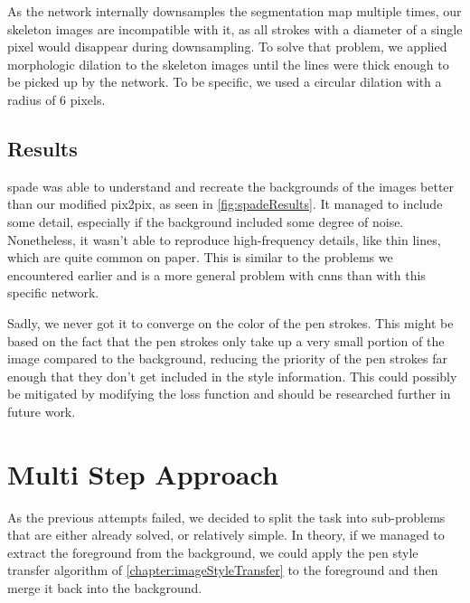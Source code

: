 As the network internally downsamples the segmentation map multiple times, our skeleton images are incompatible with it, as all strokes with a diameter of a single pixel would disappear during downsampling. To solve that problem, we applied morphologic dilation to the skeleton images until the lines were thick enough to be picked up by the network. To be specific, we used a circular dilation with a radius of 6 pixels.

\subsection{Results}



\gls{spade} was able to understand and recreate the backgrounds of the images better than our modified \gls{pix2pix}, as seen in \cref{fig:spadeResults}. It managed to include some detail, especially if the background included some degree of noise. Nonetheless, it wasn't able to reproduce high-frequency details, like thin lines, which are quite common on paper. This is similar to the problems we encountered earlier and is a more general problem with \glspl{cnn} than with this specific network.

Sadly, we never got it to converge on the color of the pen strokes. This might be based on the fact that the pen strokes only take up a very small portion of the image compared to the background, reducing the priority of the pen strokes far enough that they don't get included in the style information. This could possibly be mitigated by modifying the loss function and should be researched further in future work.


\section{Multi Step Approach}
As the previous attempts failed, we decided to split the task into sub-problems that are either already solved, or relatively simple.
In theory, if we managed to extract the foreground from the background, we could apply the pen style transfer algorithm of \cref{chapter:imageStyleTransfer} to the foreground and then merge it back into the background.


